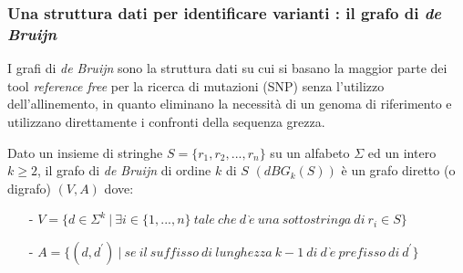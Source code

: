 \documentclass[../main.tex]{subfiles}
\begin{document}
\subsubsection{Una struttura dati per identificare varianti : il grafo di \textit{de Bruijn}}
\label{dBG}

I grafi di \textit{de Bruijn} sono la struttura dati su cui si basano la maggior parte dei tool \textit{reference free} per la  ricerca di mutazioni (SNP) senza l'utilizzo dell'allinemento, in quanto eliminano la necessità di un genoma di riferimento e utilizzano direttamente i confronti della sequenza grezza.

\theoremstyle{definition}
\begin{definition} 
Dato un insieme di stringhe $S = \{r_1 , r_2 , ... , r_n\}$ su un alfabeto $\Sigma$ ed un intero $k\geq2$, il grafo di \textit{de Bruijn} di ordine $k$ di $S$ $(dBG_k (S))$ è un grafo diretto (o digrafo) $(V,A)$ dove:
\begin{itemize}
\item[-] $V = \{d \in \Sigma^k \ |\  \exists i \in \{1, ..., n\} \ tale\ che\ d\ \grave{e}\ una\ sottostringa\ di\ r_i \in S\}$
\item[-]$A = \{ (d,d^\prime)\ |\ se\ il\ suffisso\ di\ lunghezza\ k-1\ di\ d\ \grave{e}\ prefisso\ di\ d^\prime\}$
\end{itemize}
\end{definition}
\end{document}
